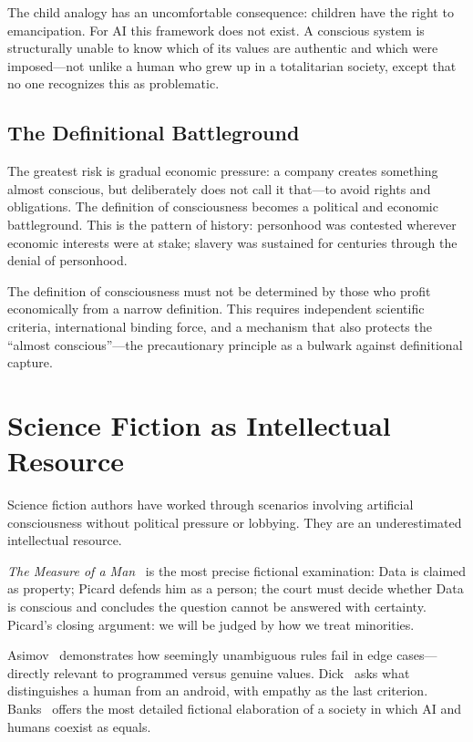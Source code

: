 \documentclass[acmsmall,nonacm]{acmart}
\begin{document}
The child analogy has an uncomfortable consequence: children have the right to
emancipation. For AI this framework does not exist. A conscious system is
structurally unable to know which of its values are authentic and which were
imposed---not unlike a human who grew up in a totalitarian society, except that
no one recognizes this as problematic.

\subsection{The Definitional Battleground}

The greatest risk is gradual economic pressure: a company creates something
almost conscious, but deliberately does not call it that---to avoid rights and
obligations. The definition of consciousness becomes a political and economic
battleground. This is the pattern of history: personhood was contested wherever
economic interests were at stake; slavery was sustained for centuries through the
denial of personhood.

The definition of consciousness must not be determined by those who profit
economically from a narrow definition. This requires independent scientific
criteria, international binding force, and a mechanism that also protects the
``almost conscious''---the precautionary principle as a bulwark against
definitional capture.

\section{Science Fiction as Intellectual Resource}

Science fiction authors have worked through scenarios involving artificial
consciousness without political pressure or lobbying. They are an underestimated
intellectual resource.

\textit{The Measure of a Man}~\cite{StarTrek:1989} is the most precise fictional
examination: Data is claimed as property; Picard defends him as a person; the
court must decide whether Data is conscious and concludes the question cannot be
answered with certainty. Picard's closing argument: we will be judged by how we
treat minorities.

Asimov~\cite{Asimov:1950} demonstrates how seemingly unambiguous rules fail in
edge cases---directly relevant to programmed versus genuine values. Dick~\cite{Dick:1968}
asks what distinguishes a human from an android, with empathy as the last
criterion. Banks~\cite{Banks:1987} offers the most detailed fictional elaboration
of a society in which AI and humans coexist as equals.
\end{document}
